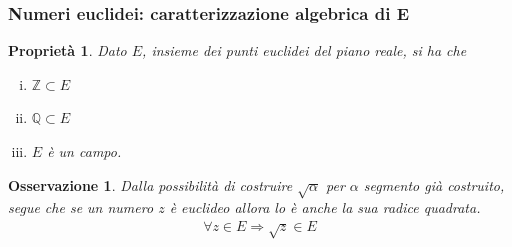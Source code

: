 \documentclass[11pt]{beamer}
\newtheorem{osservazione}{Osservazione}
\newtheorem{prop}{Proprietà}
\begin{document}
\begin{frame}
\frametitle{Numeri euclidei: caratterizzazione algebrica di E }

\begin{prop}
Dato $E$, insieme dei punti euclidei del piano reale, si ha che
\begin{enumerate} [i)]
\item $\mathbb{Z} \subset E$ 
\item $\mathbb{Q} \subset E$
\item $E$ è un campo.
\end{enumerate}
\end{prop}

\begin{osservazione} 
Dalla possibilità di costruire $\sqrt{\alpha}$ per $\alpha$ segmento già costruito, segue che se un numero $z$ è euclideo allora lo è anche la sua radice quadrata.
\begin{align*}
\forall z \in E \Rightarrow \sqrt{z} \in E
\end{align*}
\end{osservazione}
\end{frame}




\end{document}
